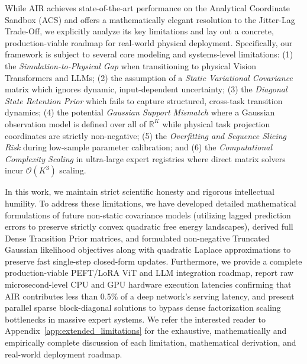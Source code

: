 While AIR achieves state-of-the-art performance on the Analytical Coordinate Sandbox (ACS) and offers a mathematically elegant resolution to the Jitter-Lag Trade-Off, we explicitly analyze its key limitations and lay out a concrete, production-viable roadmap for real-world physical deployment. Specifically, our framework is subject to several core modeling and systems-level limitations: (1) the \emph{Simulation-to-Physical Gap} when transitioning to physical Vision Transformers and LLMs; (2) the assumption of a \emph{Static Variational Covariance} matrix which ignores dynamic, input-dependent uncertainty; (3) the \emph{Diagonal State Retention Prior} which fails to capture structured, cross-task transition dynamics; (4) the potential \emph{Gaussian Support Mismatch} where a Gaussian observation model is defined over all of $\mathbb{R}^K$ while physical task projection coordinates are strictly non-negative; (5) the \emph{Overfitting and Sequence Slicing Risk} during low-sample parameter calibration; and (6) the \emph{Computational Complexity Scaling} in ultra-large expert registries where direct matrix solvers incur $\mathcal{O}(K^3)$ scaling.

In this work, we maintain strict scientific honesty and rigorous intellectual humility. To address these limitations, we have developed detailed mathematical formulations of future non-static covariance models (utilizing lagged prediction errors to preserve strictly convex quadratic free energy landscapes), derived full Dense Transition Prior matrices, and formulated non-negative Truncated Gaussian likelihood objectives along with quadratic Laplace approximations to preserve fast single-step closed-form updates. Furthermore, we provide a complete production-viable PEFT/LoRA ViT and LLM integration roadmap, report raw microsecond-level CPU and GPU hardware execution latencies confirming that AIR contributes less than 0.5\% of a deep network's serving latency, and present parallel sparse block-diagonal solutions to bypass dense factorization scaling bottlenecks in massive expert systems. We refer the interested reader to Appendix~\ref{app:extended_limitations} for the exhaustive, mathematically and empirically complete discussion of each limitation, mathematical derivation, and real-world deployment roadmap.

